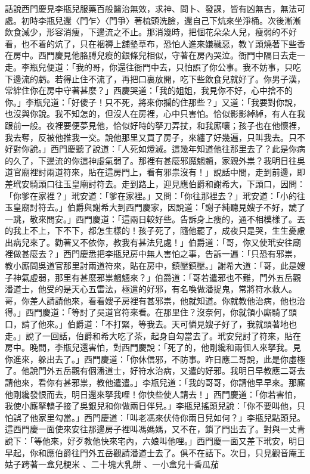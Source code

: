 \begin{showcontents}{}
話說西門慶見李瓶兒服藥百般醫治無效，求神、問卜、發課，皆有凶無吉，無法可處。初時李瓶兒還〈門乍〉〈門爭〉著梳頭洗臉，還自己下炕來坐淨桶。次後漸漸飲食減少，形容消瘦，下邊流之不止。那消幾時，把個花朵朵人兒，瘦弱的不好看，也不着的炕了，只在裀褥上舖墊草布，恐怕人進來嫌穢惡，教丫頭燒著下些香在房中。西門慶見他胳膊兒瘦的銀條兒相似，守著在房內哭泣。衙門中隔日去走一走。李瓶兒便道：「我的哥，你還往衙門中去，只怕誤了你公事。我不妨事，只吃下邊流的虧。若得止住不流了，再把口裏放開，吃下些飲食兒就好了。你男子漢，常絆住你在房中守著甚麼？」西慶哭道：「我的姐姐，我見你不好，心中捨不的你。」李瓶兒道：「好傻子！只不死，將來你攔的住那些？」又道：「我要對你說，也沒與你說。我不知怎的，但沒人在房裡，心中只害怕。恰似影影綽綽，有人在我跟前一般。夜裡要便夢見他，恰似好時的拏刀弄扙，和我廝嚷；孩子也在他懷裡，我去奪，反被他推我一交。說他那里又買了房子，來纏了好幾遍，只叫我去。只不好對你說。」西門慶聽了說道：「人死如燈滅。這幾年知道他往那里去了？此是你病的久了，下邊流的你這神虛氣弱了。那裡有甚麼邪魔魍魎，家親外祟？我明日往吳道官廟裡討兩道符來，貼在這房門上，看有邪祟沒有！」說話中間，走到前邊，即差玳安騎頭口往玉皇廟討符去。走到路上，迎見應伯爵和謝希大，下頭口，因問：「你爹在家裡？」玳安道：「爹在家裡。」又問：「你往那裡去？」玳安道：「小的往玉皇廟討符去。」伯爵與謝希大到西門慶家，因說道：「謝子純聽見嫂子不好，諕了一跳，敬來問安。」西門慶道：「這兩日較好些。告訴身上瘦的，通不相模樣了。丟的我上不上，下不下，都怎生樣的！孩子死了，隨他罷了，成夜只是哭，生生憂慮出病兒來了。勸著又不依你，教我有甚法兒處！」伯爵道：「哥，你又使玳安往廟裡做甚麼去？」西門慶悉把李瓶兒房中無人害怕之事，告訴一遍：「只恐有邪祟，教小廝問吳道官那里討兩道符來，貼在房中，鎮壓鎮壓。」謝希大道：「哥，此是嫂子神氣虛弱，那里有甚麼邪祟魍魎來？」伯爵道：「哥若遣邪也不難，門外五岳觀潘道士，他受的是天心五雷法，極遣的好邪，有名喚做潘捉鬼，常將符水救人。哥，你差人請請他來，看看嫂子房裡有甚邪祟，他就知道。你就教他治病，他也治得。」西門慶道：「等討了吳道官符來看。在那里住？沒奈何，你就領小廝騎了頭口，請了他來。」伯爵道：「不打緊，等我去。天可憐見嫂子好了，我就頭著地也走。」說了一回話，伯爵和希大吃了茶，起身自勾當去了。玳安兒討了符來，貼在房中。晚間，李瓶兒還害怕，對西門慶說：「死了的，他剛纔和兩個人來拏我。見你進來，躲出去了。」西門慶道：「你休信邪，不防事。昨日應二哥說，此是你虛極了。他說門外五岳觀有個潘道士，好符水治病，又遣的好邪。我明日早教應二哥去請他來，看你有甚邪祟，教他遣遣。」李瓶兒道：「我的哥哥，你請他早早來。那廝他剛纔發恨而去，明日還來拏我哩！你快些使人請去！」西門慶道：「你若害怕，我使小廝拏轎子接了吳銀兒和你做兩日伴兒。」李瓶兒搖頭兒說：「你不要叫他，只怕誤了他家里勾當。」西門慶道：「叫老馮來伏侍你兩日兒如何？」李瓶兒點頭兒。這西門慶一面使來安往那邊房子裡叫馮媽媽，又不在，鎖了門出去了。對與一丈青說下：「等他來，好歹教他快來宅內，六娘叫他哩。」西門慶一面又差下玳安，明日早起，你和應伯爵往門外五岳觀請潘道士去了。俱不在話下。次日，只見觀音庵王姑子跨著一盒兒粳米 、二十塊大乳餅 、一小盒兒十香瓜茄 
\end{showcontents}
